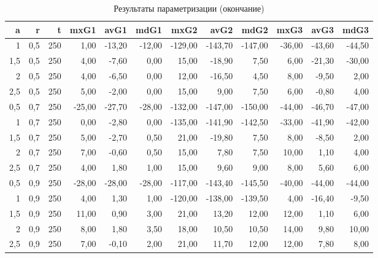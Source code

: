 \begin{table}[h]
\centering
\caption{Результаты параметризации (окончание)}
\begin{tabular}{|r|r|r|r|r|r|r|r|r|r|r|r|}
\hline
a & r & t & mxG1 & avG1 & mdG1 & mxG2 & avG2 & mdG2 & mxG3 & avG3 & mdG3 \\
\hline
1 & 0,5 & 250 & 1,00 & -13,20 & -12,00 & -129,00 & -143,70 & -147,00 & -36,00 & -43,60 & -44,50 \\
1,5 & 0,5 & 250 & 4,00 & -7,60 & 0,00 & 15,00 & -18,90 & 7,50 & 6,00 & -21,30 & -30,00 \\
2 & 0,5 & 250 & 4,00 & -6,50 & 0,00 & 12,00 & -16,50 & 4,50 & 8,00 & -9,50 & 2,00 \\
2,5 & 0,5 & 250 & 5,00 & -2,00 & 0,00 & 15,00 & 9,00 & 7,50 & 6,00 & -0,80 & 4,00 \\
0,5 & 0,7 & 250 & -25,00 & -27,70 & -28,00 & -132,00 & -147,00 & -150,00 & -44,00 & -46,70 & -47,00 \\
1 & 0,7 & 250 & 0,00 & -2,80 & 0,00 & -135,00 & -141,90 & -142,50 & -33,00 & -41,90 & -42,00 \\
1,5 & 0,7 & 250 & 5,00 & -2,70 & 0,50 & 21,00 & -19,80 & 7,50 & 8,00 & -8,50 & 2,00 \\
2 & 0,7 & 250 & 7,00 & -0,60 & 0,50 & 15,00 & 7,80 & 7,50 & 10,00 & 1,10 & 4,00 \\
2,5 & 0,7 & 250 & 4,00 & 1,80 & 1,00 & 15,00 & 9,60 & 9,00 & 8,00 & 5,60 & 6,00 \\
0,5 & 0,9 & 250 & -28,00 & -28,00 & -28,00 & -117,00 & -143,40 & -145,50 & -40,00 & -44,00 & -44,00 \\
1 & 0,9 & 250 & 4,00 & 1,30 & 1,00 & -120,00 & -138,00 & -139,50 & 4,00 & -16,40 & -9,50 \\
1,5 & 0,9 & 250 & 11,00 & 0,90 & 3,00 & 21,00 & 13,20 & 12,00 & 12,00 & 1,10 & 6,00 \\
2 & 0,9 & 250 & 8,00 & 1,80 & 3,50 & 18,00 & 10,50 & 10,50 & 14,00 & 9,80 & 10,00 \\
2,5 & 0,9 & 250 & 7,00 & -0,10 & 2,00 & 21,00 & 11,70 & 12,00 & 12,00 & 7,80 & 8,00 \\
\hline
\end{tabular}
\end{table}

